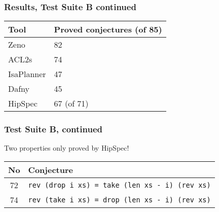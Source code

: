 \documentclass[serif,professionalfont]{beamer}
\begin{document}
\begin{frame}[fragile]
  \frametitle{Results, Test Suite B continued}

  \begin{center}
  \begin{tabular}{l l}
    Tool       & Proved conjectures (of 85) \\
    \hline
    Zeno       & 82 \\[3pt]
    ACL2s      & 74 \\[3pt]
    IsaPlanner & 47 \\[3pt]
    Dafny      & 45 \\[3pt]
    HipSpec    & 67 (of 71)
  \end{tabular}
  \end{center}

\end{frame}

\begin{frame}[fragile]
  \frametitle{Test Suite B, continued}
  Two properties only proved by HipSpec!
  \begin{center}
  \begin{tabular}{>{\small}c >{\small}l}
   No & Conjecture \\
   \hline
  72 & \verb!rev (drop i xs) = take (len xs - i) (rev xs)! \\
  74 & \verb!rev (take i xs) = drop (len xs - i) (rev xs)! \\
  \end{tabular}
  \end{center}
\end{frame}
\end{document}
